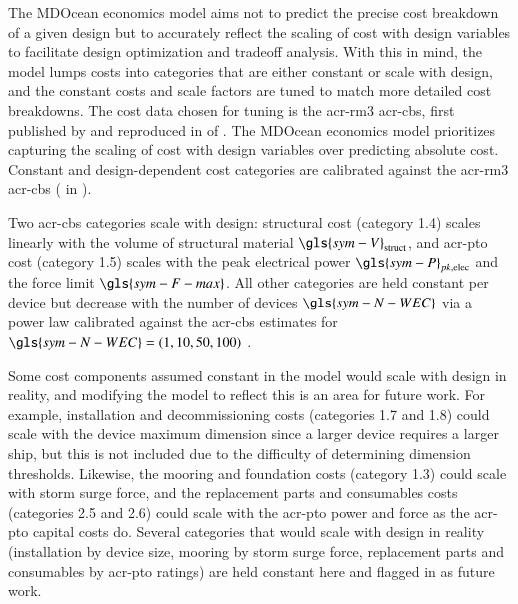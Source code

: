 \ifdefined\DISSERTATION
    The MDOcean economics model aims not to predict the precise cost breakdown of a given design but to accurately reflect the scaling of cost with design variables to facilitate design optimization and tradeoff analysis.
    With this in mind, the model lumps costs into categories that are either constant or scale with design, and the constant costs and scale factors are tuned to match more detailed cost breakdowns.
    The cost data chosen for tuning is the \gls{acr-rm3} \gls{acr-cbs}, first published by \citet{neary_reference_2014} and reproduced in  of .
\else
    The MDOcean economics model prioritizes capturing the scaling of cost with design variables over predicting absolute cost.
    Constant and design-dependent cost categories are calibrated against the \gls{acr-rm3} \gls{acr-cbs} \citep{neary_reference_2014} ( in ).
\fi

Two \gls{acr-cbs} categories scale with design: structural cost (category 1.4) scales linearly with the volume of structural material $\gls{sym-V}_{\text{struct}}$, and \gls{acr-pto} cost (category 1.5) scales with the peak electrical power $\gls{sym-P}_{pk,\text{elec}}$ and the force limit $\gls{sym-F-max}$.
All other categories are held constant per device but decrease with the number of devices $\gls{sym-N-WEC}$ via a power law calibrated against the \gls{acr-cbs} estimates for $\gls{sym-N-WEC} = (1, 10, 50, 100)$ \citep{neary_reference_2014}.

\ifdefined\DISSERTATION
    Some cost components assumed constant in the model would scale with design in reality, and modifying the model to reflect this is an area for future work.
    For example, installation and decommissioning costs (categories 1.7 and 1.8) could scale with the device maximum dimension since a larger device requires a larger ship, but this is not included due to the difficulty of determining dimension thresholds.
    Likewise, the mooring and foundation costs (category 1.3) could scale with storm surge force, and the replacement parts and consumables costs (categories 2.5 and 2.6) could scale with the \gls{acr-pto} power and force as the \gls{acr-pto} capital costs do.
\else
    Several categories that would scale with design in reality (installation by device size, mooring by storm surge force, replacement parts and consumables by \gls{acr-pto} ratings) are held constant here and flagged in  as future work.
\fi

